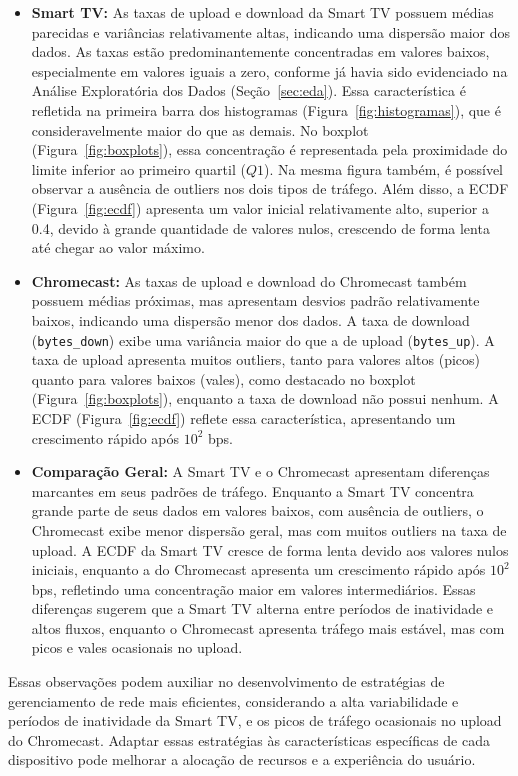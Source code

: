 \begin{itemize}

\item \textbf{Smart TV:} 
As taxas de upload e download da Smart TV possuem médias parecidas e variâncias relativamente altas, indicando uma dispersão maior dos dados. As taxas estão predominantemente concentradas em valores baixos, especialmente em valores iguais a zero, conforme já havia sido evidenciado na Análise Exploratória dos Dados (Seção~\ref{sec:eda}). Essa característica é refletida na primeira barra dos histogramas (Figura~\ref{fig:histogramas}), que é consideravelmente maior do que as demais. No boxplot (Figura~\ref{fig:boxplots}), essa concentração é representada pela proximidade do limite inferior ao primeiro quartil (\( Q1 \)). Na mesma figura também, é possível observar a ausência de outliers nos dois tipos de tráfego. Além disso, a ECDF (Figura~\ref{fig:ecdf}) apresenta um valor inicial relativamente alto, superior a 0.4, devido à grande quantidade de valores nulos, crescendo de forma lenta até chegar ao valor máximo.

\item \textbf{Chromecast:} 
As taxas de upload e download do Chromecast também possuem médias próximas, mas apresentam desvios padrão relativamente baixos, indicando uma dispersão menor dos dados. A taxa de download (\texttt{bytes\_down}) exibe uma variância maior do que a de upload (\texttt{bytes\_up}). A taxa de upload apresenta muitos outliers, tanto para valores altos (picos) quanto para valores baixos (vales), como destacado no boxplot (Figura~\ref{fig:boxplots}), enquanto a taxa de download não possui nenhum. A ECDF (Figura~\ref{fig:ecdf}) reflete essa característica, apresentando um crescimento rápido após \(10^2\) bps.

\item \textbf{Comparação Geral:} A Smart TV e o Chromecast apresentam diferenças marcantes em seus padrões de tráfego. Enquanto a Smart TV concentra grande parte de seus dados em valores baixos, com ausência de outliers, o Chromecast exibe menor dispersão geral, mas com muitos outliers na taxa de upload. A ECDF da Smart TV cresce de forma lenta devido aos valores nulos iniciais, enquanto a do Chromecast apresenta um crescimento rápido após \(10^2\) bps, refletindo uma concentração maior em valores intermediários. Essas diferenças sugerem que a Smart TV alterna entre períodos de inatividade e altos fluxos, enquanto o Chromecast apresenta tráfego mais estável, mas com picos e vales ocasionais no upload.

\end{itemize}Essas observações podem auxiliar no desenvolvimento de estratégias de gerenciamento de rede mais eficientes, considerando a alta variabilidade e períodos de inatividade da Smart TV, e os picos de tráfego ocasionais no upload do Chromecast. Adaptar essas estratégias às características específicas de cada dispositivo pode melhorar a alocação de recursos e a experiência do usuário.